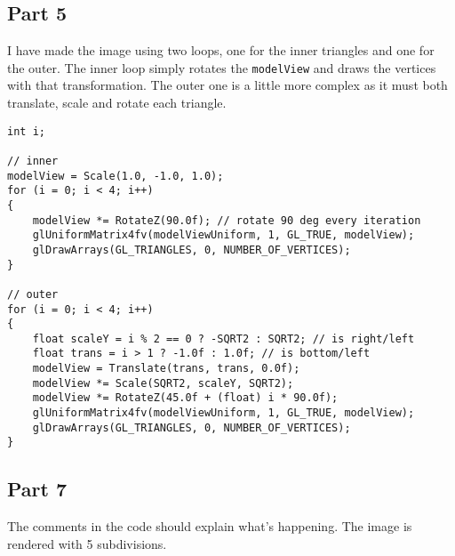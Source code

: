 \subsection{Part 5}

I have made the image using two loops, one for the inner triangles and one for the outer. The inner loop simply rotates the \texttt{modelView} and draws the vertices with that transformation. The outer one is a little more complex as it must both translate, scale and rotate each triangle.

\begin{lstlisting}
int i;

// inner
modelView = Scale(1.0, -1.0, 1.0);
for (i = 0; i < 4; i++)
{
	modelView *= RotateZ(90.0f); // rotate 90 deg every iteration
	glUniformMatrix4fv(modelViewUniform, 1, GL_TRUE, modelView);
	glDrawArrays(GL_TRIANGLES, 0, NUMBER_OF_VERTICES);
}

// outer
for (i = 0; i < 4; i++)
{
	float scaleY = i % 2 == 0 ? -SQRT2 : SQRT2; // is right/left
	float trans = i > 1 ? -1.0f : 1.0f; // is bottom/left
	modelView = Translate(trans, trans, 0.0f);
	modelView *= Scale(SQRT2, scaleY, SQRT2);
	modelView *= RotateZ(45.0f + (float) i * 90.0f);
	glUniformMatrix4fv(modelViewUniform, 1, GL_TRUE, modelView);
	glDrawArrays(GL_TRIANGLES, 0, NUMBER_OF_VERTICES);
}
\end{lstlisting}


\subsection{Part 7}
The comments in the code should explain what's happening. The image is rendered with 5 subdivisions.


